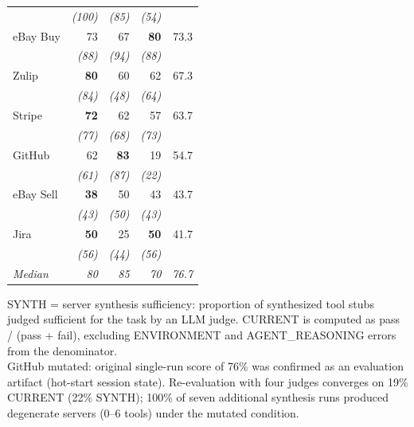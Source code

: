 \begin{table}[htbp]
\begin{tabular}{l rrr r}
                & \textit{(100)}  & \textit{(85)}   & \textit{(54)}   & \\
eBay Buy        & 73              & 67              & \textbf{80}     &  73.3 \\
                & \textit{(88)}   & \textit{(94)}   & \textit{(88)}   & \\
Zulip           & \textbf{80}     & 60              & 62              &  67.3 \\
                & \textit{(84)}   & \textit{(48)}   & \textit{(64)}   & \\
Stripe          & \textbf{72}     & 62              & 57              &  63.7 \\
                & \textit{(77)}   & \textit{(68)}   & \textit{(73)}   & \\
\cellcolor{red!12}GitHub & \cellcolor{red!12}62 & \cellcolor{red!12}\textbf{83} & \cellcolor{red!12}\cellcolor{red!12}19 & \cellcolor{red!12}54.7 \\
                & \textit{(61)}   & \textit{(87)}   & \textit{(22)}   & \\
\cellcolor{red!12}eBay Sell & \cellcolor{red!12}\textbf{38} & \cellcolor{red!12}50 & \cellcolor{red!12}43 & \cellcolor{red!12}43.7 \\
                & \textit{(43)}   & \textit{(50)}   & \textit{(43)}   & \\
\cellcolor{red!12}Jira  & \cellcolor{red!12}\textbf{50} & \cellcolor{red!12}25 & \cellcolor{red!12}\textbf{50} & \cellcolor{red!12}41.7 \\
                & \textit{(56)}   & \textit{(44)}   & \textit{(56)}   & \\
\midrule
\textit{Median} & \textit{80}     & \textit{85}     & \textit{70}     & \textit{76.7} \\
\bottomrule
\end{tabular}

\smallskip
\raggedright\footnotesize
SYNTH = server synthesis sufficiency: proportion of synthesized
tool stubs judged sufficient for the task by an LLM judge.
CURRENT is computed as pass / (pass + fail), excluding ENVIRONMENT and AGENT\_REASONING errors from the denominator.\\
GitHub mutated: original single-run score of 76\% was confirmed as an evaluation artifact (hot-start session state).
Re-evaluation with four judges converges on 19\% CURRENT (22\% SYNTH); 100\% of seven additional synthesis
runs produced degenerate servers (0--6 tools) under the mutated condition.
\end{table}
